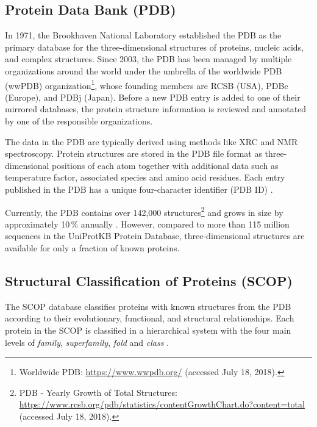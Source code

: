 \subsection{Protein Data Bank (PDB)}
\label{sec:PDB}
In 1971, the Brookhaven National Laboratory established the \acf{PDB} as the primary database for the three-dimensional structures of proteins, nucleic acids, and complex structures. 
Since 2003, the PDB has been managed by multiple organizations around the world under the umbrella of the worldwide PDB (wwPDB) organization\footnote{Worldwide PDB: \url{https://www.wwpdb.org/} (accessed July 18, 2018).}, whose founding members are RCSB (USA), PDBe (Europe), and PDBj (Japan). Before a new PDB entry is added to one of their mirrored databases, the protein structure information is reviewed and annotated by one of the responsible organizations.

The data in the \ac{PDB} are typically derived using methods like \ac{XRC} and \ac{NMR} spectroscopy. Protein structures are stored in the \ac{PDB} file format as three-dimensional positions of each atom together with additional data such as temperature factor, associated species and amino acid residues. Each entry published in the \ac{PDB} has a unique four-character identifier (PDB ID) \cite{BERNSTEIN.1977}.

 Currently, the PDB contains over 142,000 structures\footnote{PDB - Yearly Growth of Total Structures: \url{https://www.rcsb.org/pdb/statistics/contentGrowthChart.do?content=total} (accessed July 18, 2018).} and grows in size by approximately 10\,\% annually \cite{Burley.2018}. However, compared to more than 115 million sequences in the \mbox{UniProtKB} Protein Database, three-dimensional structures are available for only a fraction of known proteins.


\subsection{Structural Classification of Proteins (SCOP)}
\label{sec:SCOP}


The \ac{SCOP} database classifies proteins with known structures from the \ac{PDB} according to their evolutionary, functional, and structural relationships. Each protein in the \ac{SCOP} is classified in a hierarchical system with the four main levels of  \textit{family}, \textit{superfamily}, \textit{fold} and \textit{class} \cite{Murzin.1995}. 


